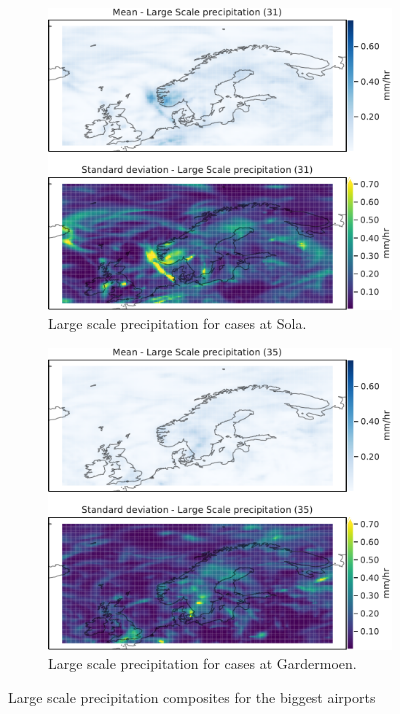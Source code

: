 \begin{figure}
\begin{subfigure}[b]{0.49\textwidth}
         \includegraphics[width=\textwidth]{Figures/lsPENZV.pdf}
         \caption{Large scale precipitation for cases at Sola.}
         \label{fig:ENZVlsP}
     \end{subfigure}
     
    \begin{subfigure}[b]{0.5\textwidth}
    \centering
    \includegraphics[width=\textwidth]{Figures/lsPENGM.pdf}
    \caption{Large scale precipitation for cases at Gardermoen.}
    \label{fig:ENGMlsP}
\end{subfigure}
\caption{Large scale precipitation composites for the biggest airports}
\label{fig:largescaleairports}
\end{figure}

